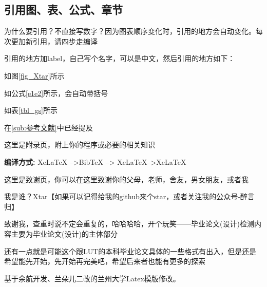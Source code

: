 \documentclass[AutoFakeBold]{LUTThesis}
\begin{document}
\subsection{引用图、表、公式、章节} %

为什么要引用？不直接写数字？因为图表顺序变化时，引用的地方会自动变化。每次更加新引用，请四步走编译

引用的地方加label，自己写个名字，可以是中文，然后引用的地方如下：

如图\ref{fig_Xtar}所示

如公式\eqref{e1e2}所示，会自动带括号

如表\ref{tbl_gs}所示

在\ref{sub:参考文献}中已经提及

% 

\backmatter


\printbib



\Appendix


这里是附录页，附上你的程序或必要的相关知识

{\bfseries 编译方式:} XeLaTeX -->BibTeX --> XeLaTeX-->XeLaTeX


\Thanks

这里是致谢页，你可以在这里致谢你的父母，老师，舍友，男女朋友，或者我~

我是谁？Xtar【如果可以记得给我的github来个star，或者关注我的公众号-醉言归】

致谢我，查重时说不定会重复的，哈哈哈哈，开个玩笑——毕业论文(设计)检测内容主要为毕业论文(设计)的主体部分

还有一点就是可能这个跟LUT的本科毕业论文具体的一些格式有出入，但是还是希望能先开始，先开始再完美吧，希望后来者也能有更多的探索~

基于余航开发、兰朵儿二改的兰州大学Latex模版修改。


\Grade %
\end{document}
